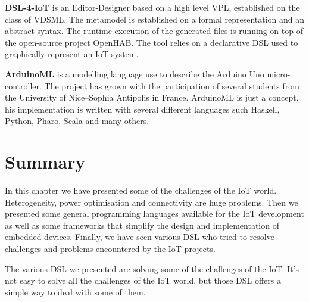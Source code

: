 \textbf{DSL-4-IoT} is an Editor-Designer based on a high level \gls{VPL},
established on the class of \gls{VDSML}\cite{Salihbegovic2015}. The metamodel is
established on a formal representation and an abstract syntax. The runtime execution of
the generated files is running on top of the open-source project
OpenHAB\cite{eichstadt2015openhab}. The tool relies on a declarative \gls{DSL}
used to graphically represent an \gls{IoT} system.

\textbf{ArduinoML} is a modelling language use to describe the Arduino Uno
micro-controller\cite{Mosser2014}. The project has grown with the participation
of several students from the University of Nice–Sophia Antipolis in France.
ArduinoML is just a concept, his implementation is written with several
different languages such Haskell, Python, Pharo, Scala and many
others\cite{Mooser2017}.

\section{Summary}
\label{sec:iot_dev_summary}

In this chapter we have presented some of the challenges of the \gls{IoT} world.
Heterogeneity, power optimisation and connectivity are huge problems. Then we
presented some general programming languages available for the \gls{IoT}
development as well as some frameworks that simplify the design and
implementation of embedded devices. Finally, we have seen various \gls{DSL} who
tried to resolve challenges and problems encountered by the \gls{IoT}
projects.

The various \gls{DSL} we presented are solving some of the challenges of the
\gls{IoT}. It's not easy to solve all the challenges of the \gls{IoT} world, but
those \gls{DSL} offers a simple way to deal with some of them.

